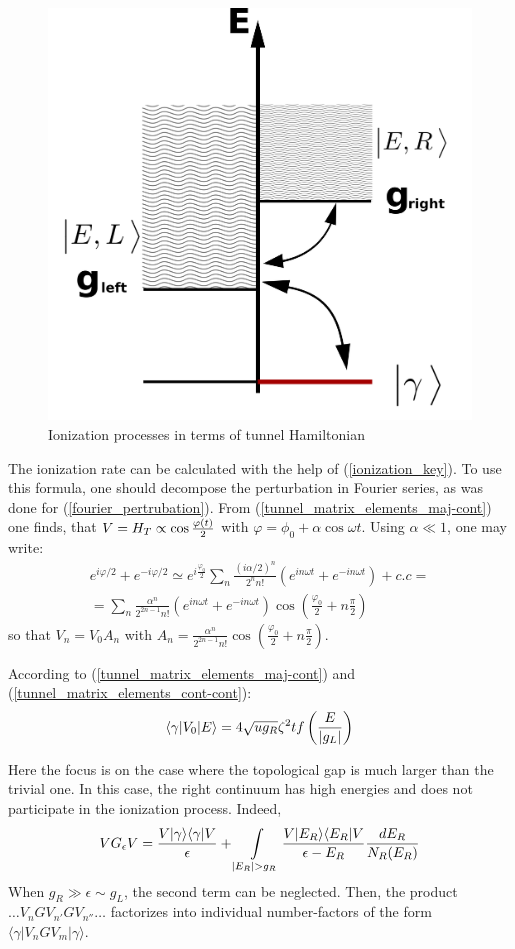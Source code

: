 \begin{figure}[H]
	\centering
	\includegraphics[width=0.6\linewidth]{images/tunneling}
	\caption{Ionization processes in terms of tunnel Hamiltonian}
	\label{fig:tunneling}
\end{figure}

The ionization rate can be calculated with the help of  (\ref{ionization_key}). To use this formula, one should decompose the  perturbation in Fourier series, as was done for (\ref{fourier_pertrubation}). From  (\ref{tunnel_matrix_elements_maj-cont}) one finds, that $ V=H_T\propto\cos\frac{\varphi\left(t\right)}{2} $ with $ \varphi=\phi_{0}+\alpha\cos\omega t $. Using $ \alpha\ll1 $, one may write:
\begin{multline}
	e^{i\varphi/2}+e^{-i\varphi/2}\simeq e^{i\frac{\varphi_{0}}{2}}\sum_{n}\frac{(i\alpha/2)^{n}}{2^{n}n!}(e^{in\omega t}+e^{-in\omega t})+c.c=\\=\sum_{n}\frac{\alpha{}^{n}}{2^{2n-1}n!}(e^{in\omega t}+e^{-in\omega t})\cos\left(\frac{\varphi_{0}}{2}+n\frac{\pi}{2}\right)
\end{multline}
so that $ V_{n}=V_{0}A_{n} $ with $ A_{n}=\frac{\alpha^{n}}{2^{2n-1}n!}\cos\left(\frac{\varphi_{0}}{2}+n\frac{\pi}{2}\right) $.

According to (\ref{tunnel_matrix_elements_maj-cont}) and (\ref{tunnel_matrix_elements_cont-cont}):
\begin{gather}
\label{tunnel_element_factorized}
	\langle\gamma|V_{0}|E\rangle=4\sqrt{ug_{R}}\zeta^{2}tf\left(\frac{E}{\left|g_L\right|}\right)
\end{gather}

Here the focus is on the case where the topological gap is much larger than the trivial one. In this case, the right continuum has high energies and does not participate in the ionization process. Indeed,
\begin{gather}
	V G_{\epsilon} V
	=
	\frac{V|\gamma\rangle\langle\gamma|V}{\epsilon}+\intop_{|E_{R}|>g_{R}}\frac{V|E_{R}\rangle\langle E_{R}|V}{\epsilon-E_{R}}\frac{dE_{R}}{N_{R}(E_{R})}
\end{gather}
When $ g_{R}\gg\epsilon\sim g_{L} $, the second term can be neglected. Then, the product $ \dots V_{n}GV_{n'}GV_{n''}\dots $ factorizes into individual number-factors of the form $ \langle\gamma|V_{n}GV_{m}|\gamma\rangle $.

